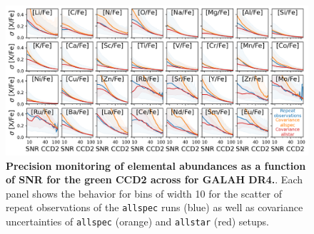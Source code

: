 \documentclass[
  journal=pasa,
  manuscript=research-paper, %
  year=2024,
  volume=37
]{cup-journal}
\begin{document}
\begin{figure}[ht]
 \centering
 \includegraphics[width=\textwidth]{figures/galah_dr4_precision_abundances.png}
 \caption{\textbf{Precision monitoring of elemental abundances as a function of SNR for the green CCD2 across for GALAH DR4.}. Each panel shows the behavior for bins of width 10 for the scatter of repeat observations of the \texttt{allspec} runs (blue) as well as covariance uncertainties of \texttt{allspec} (orange) and \texttt{allstar} (red) setups.}
 \label{fig:galah_dr4_precision_abundances}
\end{figure}
\end{document}
